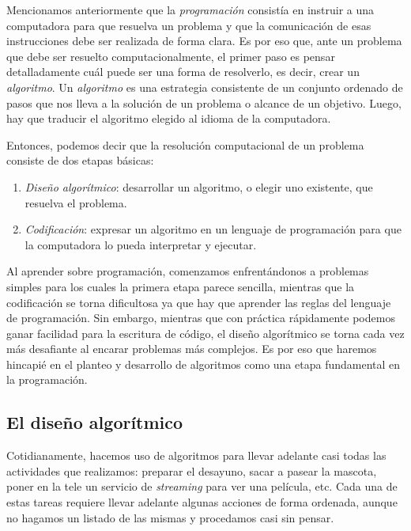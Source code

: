 \documentclass[
]{book}
\providecommand{\tightlist}{%
  \setlength{\itemsep}{0pt}\setlength{\parskip}{0pt}}
\begin{document}
Mencionamos anteriormente que la \emph{programación} consistía en instruir a una computadora para que resuelva un problema y que la comunicación de esas instrucciones debe ser realizada de forma clara. Es por eso que, ante un problema que debe ser resuelto computacionalmente, el primer paso es pensar detalladamente cuál puede ser una forma de resolverlo, es decir, crear un \emph{algoritmo}. Un \emph{algoritmo} es una estrategia consistente de un conjunto ordenado de pasos que nos lleva a la solución de un problema o alcance de un objetivo. Luego, hay que traducir el algoritmo elegido al idioma de la computadora.

Entonces, podemos decir que la resolución computacional de un problema consiste de dos etapas básicas:

\begin{enumerate}
\def\labelenumi{\arabic{enumi}.}
\tightlist
\item
  \emph{Diseño algorítmico}: desarrollar un algoritmo, o elegir uno existente, que resuelva el problema.
\item
  \emph{Codificación}: expresar un algoritmo en un lenguaje de programación para que la computadora lo pueda interpretar y ejecutar.
\end{enumerate}

Al aprender sobre programación, comenzamos enfrentándonos a problemas simples para los cuales la primera etapa parece sencilla, mientras que la codificación se torna dificultosa ya que hay que aprender las reglas del lenguaje de programación. Sin embargo, mientras que con práctica rápidamente podemos ganar facilidad para la escritura de código, el diseño algorítmico se torna cada vez más desafiante al encarar problemas más complejos. Es por eso que haremos hincapié en el planteo y desarrollo de algoritmos como una etapa fundamental en la programación.

\hypertarget{el-diseuxf1o-algoruxedtmico}{%
\subsection{El diseño algorítmico}\label{el-diseuxf1o-algoruxedtmico}}

Cotidianamente, hacemos uso de algoritmos para llevar adelante casi todas las actividades que realizamos: preparar el desayuno, sacar a pasear la mascota, poner en la tele un servicio de \emph{streaming} para ver una película, etc. Cada una de estas tareas requiere llevar adelante algunas acciones de forma ordenada, aunque no hagamos un listado de las mismas y procedamos casi sin pensar.
\end{document}
